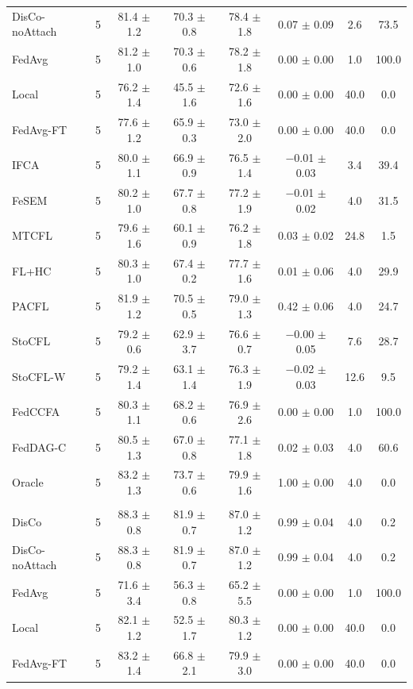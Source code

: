{{\begin{tabular}{l r c c c c c c}
DisCo-noAttach & 5 & 81.4 $\pm$ 1.2 & 70.3 $\pm$ 0.8 & 78.4 $\pm$ 1.8 & 0.07 $\pm$ 0.09 & 2.6 & 73.5 \\
FedAvg & 5 & 81.2 $\pm$ 1.0 & 70.3 $\pm$ 0.6 & 78.2 $\pm$ 1.8 & 0.00 $\pm$ 0.00 & 1.0 & 100.0 \\
Local & 5 & 76.2 $\pm$ 1.4 & 45.5 $\pm$ 1.6 & 72.6 $\pm$ 1.6 & 0.00 $\pm$ 0.00 & 40.0 & 0.0 \\
FedAvg-FT & 5 & 77.6 $\pm$ 1.2 & 65.9 $\pm$ 0.3 & 73.0 $\pm$ 2.0 & 0.00 $\pm$ 0.00 & 40.0 & 0.0 \\
IFCA & 5 & 80.0 $\pm$ 1.1 & 66.9 $\pm$ 0.9 & 76.5 $\pm$ 1.4 & $-$0.01 $\pm$ 0.03 & 3.4 & 39.4 \\
FeSEM & 5 & 80.2 $\pm$ 1.0 & 67.7 $\pm$ 0.8 & 77.2 $\pm$ 1.9 & $-$0.01 $\pm$ 0.02 & 4.0 & 31.5 \\
MTCFL & 5 & 79.6 $\pm$ 1.6 & 60.1 $\pm$ 0.9 & 76.2 $\pm$ 1.8 & 0.03 $\pm$ 0.02 & 24.8 & 1.5 \\
FL+HC & 5 & 80.3 $\pm$ 1.0 & 67.4 $\pm$ 0.2 & 77.7 $\pm$ 1.6 & 0.01 $\pm$ 0.06 & 4.0 & 29.9 \\
PACFL & 5 & 81.9 $\pm$ 1.2 & 70.5 $\pm$ 0.5 & 79.0 $\pm$ 1.3 & 0.42 $\pm$ 0.06 & 4.0 & 24.7 \\
StoCFL & 5 & 79.2 $\pm$ 0.6 & 62.9 $\pm$ 3.7 & 76.6 $\pm$ 0.7 & $-$0.00 $\pm$ 0.05 & 7.6 & 28.7 \\
StoCFL-W & 5 & 79.2 $\pm$ 1.4 & 63.1 $\pm$ 1.4 & 76.3 $\pm$ 1.9 & $-$0.02 $\pm$ 0.03 & 12.6 & 9.5 \\
FedCCFA & 5 & 80.3 $\pm$ 1.1 & 68.2 $\pm$ 0.6 & 76.9 $\pm$ 2.6 & 0.00 $\pm$ 0.00 & 1.0 & 100.0 \\
FedDAG-C & 5 & 80.5 $\pm$ 1.3 & 67.0 $\pm$ 0.8 & 77.1 $\pm$ 1.8 & 0.02 $\pm$ 0.03 & 4.0 & 60.6 \\
Oracle & 5 & 83.2 $\pm$ 1.3 & 73.7 $\pm$ 0.6 & 79.9 $\pm$ 1.6 & 1.00 $\pm$ 0.00 & 4.0 & 0.0 \\
\addlinespace
\multicolumn{8}{l}{\textit{CIFAR-10 (ResNet) label swap}} \\
DisCo & 5 & 88.3 $\pm$ 0.8 & 81.9 $\pm$ 0.7 & 87.0 $\pm$ 1.2 & 0.99 $\pm$ 0.04 & 4.0 & 0.2 \\
DisCo-noAttach & 5 & 88.3 $\pm$ 0.8 & 81.9 $\pm$ 0.7 & 87.0 $\pm$ 1.2 & 0.99 $\pm$ 0.04 & 4.0 & 0.2 \\
FedAvg & 5 & 71.6 $\pm$ 3.4 & 56.3 $\pm$ 0.8 & 65.2 $\pm$ 5.5 & 0.00 $\pm$ 0.00 & 1.0 & 100.0 \\
Local & 5 & 82.1 $\pm$ 1.2 & 52.5 $\pm$ 1.7 & 80.3 $\pm$ 1.2 & 0.00 $\pm$ 0.00 & 40.0 & 0.0 \\
FedAvg-FT & 5 & 83.2 $\pm$ 1.4 & 66.8 $\pm$ 2.1 & 79.9 $\pm$ 3.0 & 0.00 $\pm$ 0.00 & 40.0 & 0.0 \\

\end{tabular}}}
